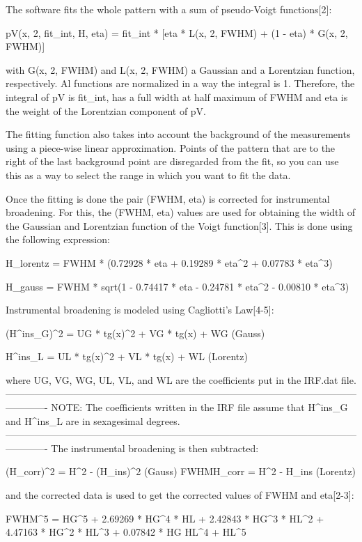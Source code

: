 The software fits the whole pattern with a sum of pseudo-Voigt functions[2]:

    pV(x, 2\theta, fit_int, H, eta) = fit_int * [eta * L(x, 2\theta, FWHM) + (1 - eta) * G(x, 2\theta, FWHM)]

with G(x, 2\theta, FWHM) and L(x, 2\theta, FWHM) a Gaussian and a Lorentzian function, respectively. Al functions are normalized in a way the integral is 1. Therefore, the integral of pV is fit_int, has a full width at half maximum of FWHM and eta is the weight of the Lorentzian component of pV.

The fitting function also takes into account the background of the measurements using a piece-wise linear approximation. Points of the pattern that are to the right of the last background point are disregarded from the fit, so you can use this as a way to select the range in which you want to fit the data.

Once the fitting is done the pair (FWHM, eta) is corrected for instrumental broadening. For this, the (FWHM, eta) values are used for obtaining the width of the Gaussian and Lorentzian function of the Voigt function[3]. This is done using the following expression:

H_{lorentz} = FWHM * (0.72928 * eta + 0.19289 * eta^2 + 0.07783 * eta^3)

H_{gauss} = FWHM * sqrt(1 - 0.74417 * eta - 0.24781 * eta^2 - 0.00810 * eta^3)

Instrumental broadening is modeled using Cagliotti's Law[4-5]:

(H^ins_G)^2 = UG * tg(x)^2 + VG * tg(x) + WG (Gauss)

H^ins_L = UL * tg(x)^2 + VL * tg(x) + WL (Lorentz)

where UG, VG, WG, UL, VL, and WL are the coefficients put in the IRF.dat file.
-------------------------------------------------------------------------------------------------------------------------
NOTE: The coefficients written in the IRF file assume that H^ins_G and H^ins_L are in sexagesimal degrees.
-------------------------------------------------------------------------------------------------------------------------
The instrumental broadening is then subtracted:

(H_corr)^2 = H^2 - (H_ins)^2 (Gauss)
FWHMH_corr = H^2 - H_ins (Lorentz)

and the corrected data is used to get the corrected values of FWHM and eta[2-3]:

FWHM^5 = HG^5 + 2.69269 * HG^4 * HL + 2.42843 * HG^3 * HL^2 + 4.47163 * HG^2 * HL^3 + 0.07842 * HG HL^4 + HL^5


